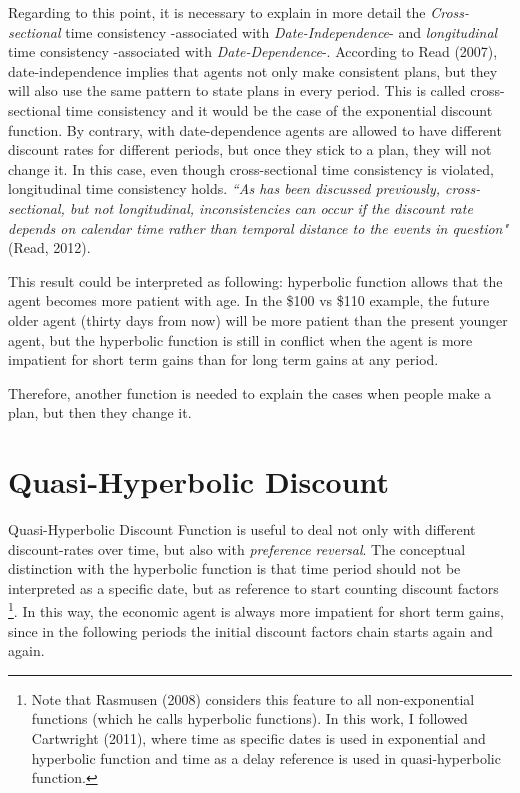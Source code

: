 \documentclass[]{article}
\begin{document}
Regarding to this point, it is necessary to explain in more detail the \emph{Cross-sectional} time consistency -associated with \emph{Date-Independence}- and \emph{longitudinal} time consistency -associated with \emph{Date-Dependence}-. According to Read (2007), date-independence implies that agents not only make consistent plans, but they will also use the same pattern to state plans in every period. This is called cross-sectional time consistency and it would be the case of the exponential discount function. By contrary, with date-dependence agents are allowed to have different discount rates for different periods, but once they stick to a plan, they will not change it. In this case, even though cross-sectional time consistency is violated, longitudinal time consistency holds. \emph{``As has been discussed previously, cross-sectional, but not longitudinal, inconsistencies can occur if the discount rate depends on calendar time rather than temporal distance to the events in question"} (Read, 2012).

This result could be interpreted as following: hyperbolic function allows that the agent becomes more patient with age. In the \$100 vs \$110 example, the future older agent (thirty days from now) will be more patient than the present younger agent, but the hyperbolic function is still in conflict when the agent is more impatient for short term gains than for long term gains at any period.

Therefore, another function is needed to explain the cases when people make a plan, but then they change it.

\hypertarget{quasi-hyperbolic-discount}{%
\section{Quasi-Hyperbolic Discount}\label{quasi-hyperbolic-discount}}

Quasi-Hyperbolic Discount Function is useful to deal not only with different discount-rates over time, but also with \emph{preference reversal}. The conceptual distinction with the hyperbolic function is that time period should not be interpreted as a specific date, but as reference to start counting discount factors \footnote{Note that Rasmusen (2008) considers this feature to all non-exponential functions (which he calls hyperbolic functions). In this work, I followed Cartwright (2011), where time as specific dates is used in exponential and hyperbolic function and time as a delay reference is used in quasi-hyperbolic function.}. In this way, the economic agent is always more impatient for short term gains, since in the following periods the initial discount factors chain starts again and again.
\end{document}
